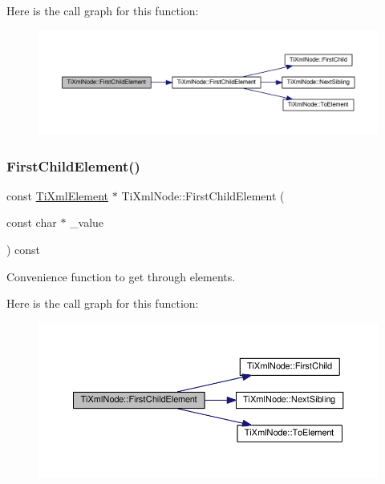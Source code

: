 Here is the call graph for this function\+:\nopagebreak
\begin{figure}[H]
\begin{center}
\leavevmode
\includegraphics[width=350pt]{class_ti_xml_node_aa0fecff1f3866ab33a8a25506e95db1d_cgraph}
\end{center}
\end{figure}
\mbox{\label{class_ti_xml_node_aab23fca4c2455c1d926c35d85a663842}} 
\subsubsection{\texorpdfstring{First\+Child\+Element()}{FirstChildElement()}\hspace{0.1cm}{\footnotesize\ttfamily [3/4]}}
{\footnotesize\ttfamily const \hyperlink{class_ti_xml_element}{Ti\+Xml\+Element} $\ast$ Ti\+Xml\+Node\+::\+First\+Child\+Element (\begin{DoxyParamCaption}\item[{const char $\ast$}]{\+\_\+value }\end{DoxyParamCaption}) const}



Convenience function to get through elements. 

Here is the call graph for this function\+:\nopagebreak
\begin{figure}[H]
\begin{center}
\leavevmode
\includegraphics[width=350pt]{class_ti_xml_node_aab23fca4c2455c1d926c35d85a663842_cgraph}
\end{center}
\end{figure}
\mbox{\label{class_ti_xml_node_a6936ae323675071808ac4840379e57f5}} 
